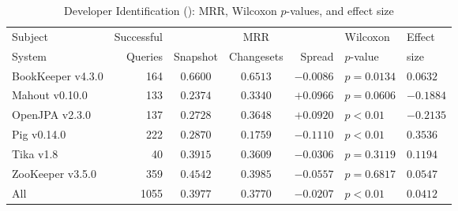 \begin{table}[t]
\centering
\caption{Developer Identification (\done): MRR, Wilcoxon $p$-values, and effect size}
\begin{tabular}{l|r|ccr|ll}
\toprule
Subject & Successful &    & MRR &        & Wilcoxon  & Effect \\
System  & Queries    & Snapshot & Changesets  & Spread & $p$-value & size \\
\midrule
BookKeeper v4.3.0 & 164 & $\bm{0.6600}$ & $0.6513$ & $-0.0086$ & $p = 0.0134$ & $0.0632$ \\
Mahout v0.10.0 & 133 & $0.2374$ & $\bm{0.3340}$ & $+0.0966$ & $p = 0.0606$ & $-0.1884$ \\
OpenJPA v2.3.0 & 137 & $0.2728$ & $\bm{0.3648}$ & $+0.0920$ & $p < 0.01$ & $-0.2135$ \\
Pig v0.14.0 & 222 & $\bm{0.2870}$ & $0.1759$ & $-0.1110$ & $p < 0.01$ & $0.3536$ \\
Tika v1.8 & 40 & $\bm{0.3915}$ & $0.3609$ & $-0.0306$ & $p = 0.3119$ & $0.1194$ \\
ZooKeeper v3.5.0 & 359 & $\bm{0.4542}$ & $0.3985$ & $-0.0557$ & $p = 0.6817$ & $0.0547$ \\
\midrule
All & 1055 & $\bm{0.3977}$ & $0.3770$ & $-0.0207$ & $p < 0.01$ & $0.0412$ \\
\bottomrule
\end{tabular}
\label{table:triage_rq1}
\end{table}
